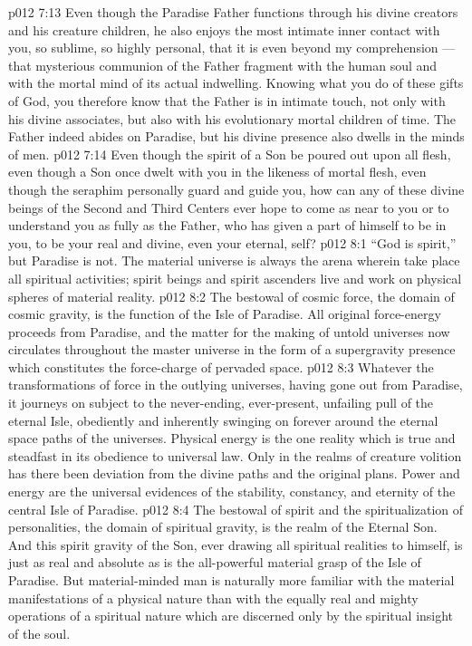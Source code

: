 \vs p012 7:13 \pc Even though the Paradise Father functions through his divine creators and his creature children, he also enjoys the most intimate inner contact with you, so sublime, so highly personal, that it is even beyond my comprehension --- that mysterious communion of the Father fragment with the human soul and with the mortal mind of its actual indwelling. Knowing what you do of these gifts of God, you therefore know that the Father is in intimate touch, not only with his divine associates, but also with his evolutionary mortal children of time. The Father indeed abides on Paradise, but his divine presence also dwells in the minds of men.
\vs p012 7:14 Even though the spirit of a Son be poured out upon all flesh, even though a Son once dwelt with you in the likeness of mortal flesh, even though the seraphim personally guard and guide you, how can any of these divine beings of the Second and Third Centers ever hope to come as near to you or to understand you as fully as the Father, who has given a part of himself to be in you, to be your real and divine, even your eternal, self?
\vs p012 8:1 “God is spirit,” but Paradise is not. The material universe is always the arena wherein take place all spiritual activities; spirit beings and spirit ascenders live and work on physical spheres of material reality.
\vs p012 8:2 \pc The bestowal of cosmic force, the domain of cosmic gravity, is the function of the Isle of Paradise. All original force\hyp{}energy proceeds from Paradise, and the matter for the making of untold universes now circulates throughout the master universe in the form of a supergravity presence which constitutes the force\hyp{}charge of pervaded space.
\vs p012 8:3 Whatever the transformations of force in the outlying universes, having gone out from Paradise, it journeys on subject to the never\hyp{}ending, ever\hyp{}present, unfailing pull of the eternal Isle, obediently and inherently swinging on forever around the eternal space paths of the universes. Physical energy is the one reality which is true and steadfast in its obedience to universal law. Only in the realms of creature volition has there been deviation from the divine paths and the original plans. Power and energy are the universal evidences of the stability, constancy, and eternity of the central Isle of Paradise.
\vs p012 8:4 \pc The bestowal of spirit and the spiritualization of personalities, the domain of spiritual gravity, is the realm of the Eternal Son. And this spirit gravity of the Son, ever drawing all spiritual realities to himself, is just as real and absolute as is the all\hyp{}powerful material grasp of the Isle of Paradise. But material\hyp{}minded man is naturally more familiar with the material manifestations of a physical nature than with the equally real and mighty operations of a spiritual nature which are discerned only by the spiritual insight of the soul.
